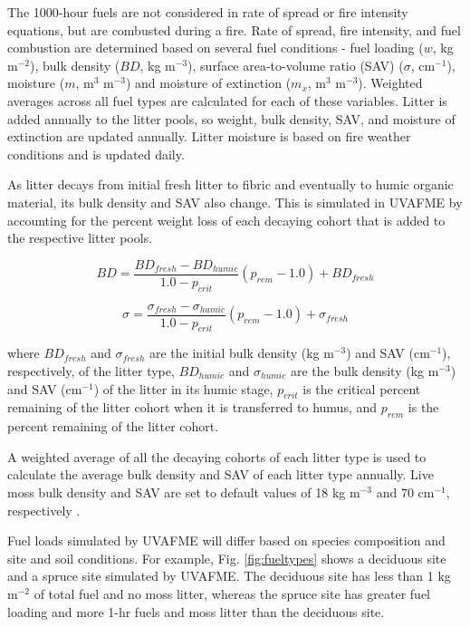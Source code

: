 \documentclass[a4paper, 12pt] {report}
\begin{document}
The 1000-hour fuels are not considered in rate of spread or fire intensity equations, but are combusted during a fire. Rate of spread, fire intensity, and fuel combustion are determined based on several fuel conditions - fuel loading ($w$, kg m$^{-2}$), bulk density ($BD$, kg m$^{-3}$), surface area-to-volume ratio (SAV) ($\sigma$, cm$^{-1}$), moisture ($m$, m$^3$ m$^{-3}$) and moisture of extinction ($m_x$, m$^3$ m$^{-3}$). Weighted averages across all fuel types are calculated for each of these variables. Litter is added annually to the litter pools, so weight, bulk density, SAV, and moisture of extinction are updated annually. Litter moisture is based on fire weather conditions and is updated daily. 

As litter decays from initial fresh litter to fibric and eventually to humic organic material, its bulk density and SAV also change. This is simulated in UVAFME by accounting for the percent weight loss of each decaying cohort that is added to the respective litter pools.

\begin{equation} 
	BD = \frac{BD_{fresh} - BD_{humic}}{1.0 - p_{crit}}(p_{rem} - 1.0) + BD_{fresh}
\end{equation}

\begin{equation} 
	\sigma = \frac{\sigma_{fresh} - \sigma_{humic}}{1.0 - p_{crit}}(p_{rem} - 1.0) + \sigma_{fresh}
\end{equation}

where $BD_{fresh}$ and $\sigma_{fresh}$ are the initial bulk density (kg m$^{-3}$) and SAV (cm$^{-1}$), respectively, of the litter type, $BD_{humic}$ and $\sigma_{humic}$ are the bulk density (kg m$^{-3}$) and SAV (cm$^{-1}$) of the litter in its humic stage, $p_{crit}$ is the critical percent remaining of the litter cohort when it is transferred to humus, and $p_{rem}$ is the percent remaining of the litter cohort.

A weighted average of all the decaying cohorts of each litter type is used to calculate the average bulk density and SAV of each litter type annually. Live moss bulk density and SAV are set to default values of 18 kg m$^{-3}$ and 70 cm$^{-1}$, respectively \cite{cronanHowSuccessionAffects2008}.

Fuel loads simulated by UVAFME will differ based on species composition and site and soil conditions. For example, Fig. \ref{fig:fueltypes} shows a deciduous site and a spruce site simulated by UVAFME. The deciduous site has less than 1 kg m$^{-2}$ of total fuel and no moss litter, whereas the spruce site has greater fuel loading and more 1-hr fuels and moss litter than the deciduous site.
\end{document}
